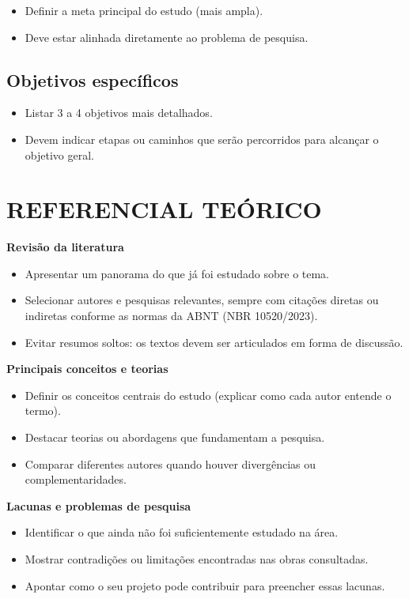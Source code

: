 \documentclass[
  brazilian,
  12pt,
  letterpaper,
  DIV=11,
  numbers=noendperiod]{scrartcl}
\providecommand{\tightlist}{%
  \setlength{\itemsep}{0pt}\setlength{\parskip}{0pt}}
\begin{document}
\begin{itemize}
\item
  Definir a meta principal do estudo (mais ampla).
\item
  Deve estar alinhada diretamente ao problema de pesquisa.
\end{itemize}

\subsection{Objetivos específicos}\label{objetivos-especuxedficos}

\begin{itemize}
\tightlist
\item
  Listar 3 a 4 objetivos mais detalhados.
\item
  Devem indicar etapas ou caminhos que serão percorridos para alcançar o
  objetivo geral.
\end{itemize}

\section{REFERENCIAL TEÓRICO}\label{referencial-teuxf3rico}

\textbf{Revisão da literatura}

\begin{itemize}
\item
  Apresentar um panorama do que já foi estudado sobre o tema.
\item
  Selecionar autores e pesquisas relevantes, sempre com citações diretas
  ou indiretas conforme as normas da ABNT (NBR 10520/2023).
\item
  Evitar resumos soltos: os textos devem ser articulados em forma de
  discussão.
\end{itemize}

\textbf{Principais conceitos e teorias}

\begin{itemize}
\item
  Definir os conceitos centrais do estudo (explicar como cada autor
  entende o termo).
\item
  Destacar teorias ou abordagens que fundamentam a pesquisa.
\item
  Comparar diferentes autores quando houver divergências ou
  complementaridades.
\end{itemize}

\textbf{Lacunas e problemas de pesquisa}

\begin{itemize}
\item
  Identificar o que ainda não foi suficientemente estudado na área.
\item
  Mostrar contradições ou limitações encontradas nas obras consultadas.
\item
  Apontar como o seu projeto pode contribuir para preencher essas
  lacunas.
\end{itemize}
\end{document}
